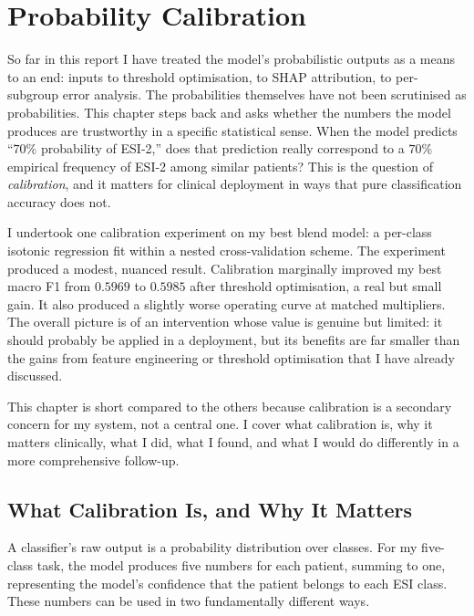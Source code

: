 
\chapter{Probability Calibration}
\label{ch:calibration}

So far in this report I have treated the model's probabilistic outputs as a means to an end: inputs to threshold optimisation, to SHAP attribution, to per-subgroup error analysis. The probabilities themselves have not been scrutinised as probabilities. This chapter steps back and asks whether the numbers the model produces are trustworthy in a specific statistical sense. When the model predicts ``$70\%$ probability of ESI-2,'' does that prediction really correspond to a $70\%$ empirical frequency of ESI-2 among similar patients? This is the question of \emph{calibration}, and it matters for clinical deployment in ways that pure classification accuracy does not.

I undertook one calibration experiment on my best blend model: a per-class isotonic regression fit within a nested cross-validation scheme. The experiment produced a modest, nuanced result. Calibration marginally improved my best macro F1 from $0.5969$ to $0.5985$ after threshold optimisation, a real but small gain. It also produced a slightly worse operating curve at matched multipliers. The overall picture is of an intervention whose value is genuine but limited: it should probably be applied in a deployment, but its benefits are far smaller than the gains from feature engineering or threshold optimisation that I have already discussed.

This chapter is short compared to the others because calibration is a secondary concern for my system, not a central one. I cover what calibration is, why it matters clinically, what I did, what I found, and what I would do differently in a more comprehensive follow-up.

\section{What Calibration Is, and Why It Matters}

A classifier's raw output is a probability distribution over classes. For my five-class task, the model produces five numbers for each patient, summing to one, representing the model's confidence that the patient belongs to each ESI class. These numbers can be used in two fundamentally different ways.

